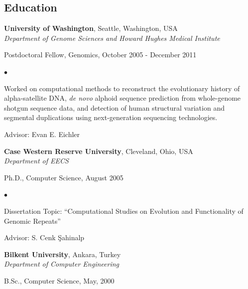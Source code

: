 \documentclass[margin,line]{res}
\newenvironment{list1}{
  \begin{list}{\ding{113}}{%
      \setlength{\itemsep}{0in}
      \setlength{\parsep}{0in} \setlength{\parskip}{0in}
      \setlength{\topsep}{0in} \setlength{\partopsep}{0in} 
      \setlength{\leftmargin}{0.17in}}}{\end{list}}
\newenvironment{list2}{
  \begin{list}{$\bullet$}{%
      \setlength{\itemsep}{0in}
      \setlength{\parsep}{0in} \setlength{\parskip}{0in}
      \setlength{\topsep}{0in} \setlength{\partopsep}{0in} 
      \setlength{\leftmargin}{0.2in}}}{\end{list}}
\begin{document}
\begin{resume}
  \section{\sc Education}
          {\bf University of Washington}, Seattle, Washington, USA\\
          {\em Department of Genome Sciences and Howard Hughes Medical Institute} \\
          \vspace*{-.1in}
          \begin{list1}
          \item[] Postdoctoral Fellow, Genomics, October 2005 - December 2011
            \begin{list2}
              \vspace*{.05in}
            \item
              Worked on computational methods to reconstruct
              the evolutionary history of alpha-satellite DNA, {\it de novo} alphoid sequence prediction
              from whole-genome shotgun sequence data, and detection of human structural variation and segmental duplications using next-generation
              sequencing technologies.
            \item Advisor: Evan E. Eichler
            \end{list2}
          \end{list1}
          
          {\bf Case Western Reserve University}, Cleveland, Ohio, USA\\
          {\em Department of EECS} \\
          \vspace*{-.1in}
          \begin{list1}
          \item[] Ph.D., Computer Science, August 2005
            \begin{list2}
              \vspace*{.05in}
            \item Dissertation Topic:  ``Computational Studies on Evolution and Functionality of Genomic Repeats''
            \item Advisor:  S. Cenk \c{S}ahinalp
            \end{list2}
          \end{list1}
          
          {\bf Bilkent University}, Ankara, Turkey \\
          {\em Department of Computer Engineering}\\ 
          \vspace*{-.1in}
          \begin{list1}
          \item[] B.Sc., Computer Science,  May, 2000
          \end{list1}
          

\end{resume}
\end{document}
